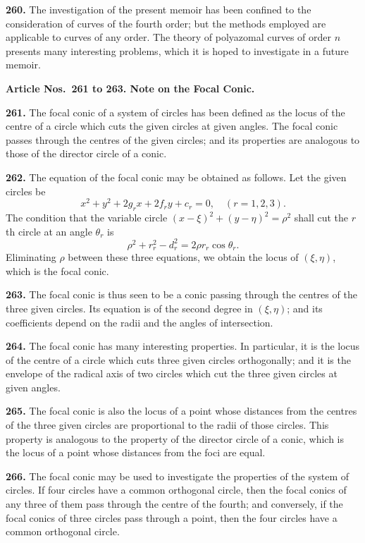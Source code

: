 \documentclass[12pt,a4paper]{article}
\theoremstyle{definition}
\begin{document}
\noindent\textbf{260.} The investigation of the present memoir has been confined to the consideration
of curves of the fourth order; but the methods employed are applicable to
curves of any order. The theory of polyazomal curves of order $n$ presents many
interesting problems, which it is hoped to investigate in a future memoir.

\vspace{0.5em}
\noindent\textbf{Article Nos.~261 to 263. Note on the Focal Conic.}

\vspace{0.3em}
\noindent\textbf{261.} The focal conic of a system of circles has been defined as the locus of the
centre of a circle which cuts the given circles at given angles. The focal conic passes
through the centres of the given circles; and its properties are analogous to those of
the director circle of a conic.

\noindent\textbf{262.} The equation of the focal conic may be obtained as follows. Let the
given circles be
\[
x^2 + y^2 + 2g_rx + 2f_ry + c_r = 0, \quad (r = 1, 2, 3).
\]
The condition that the variable circle $(x - \xi)^2 + (y - \eta)^2 = \rho^2$ shall cut the $r$th circle
at an angle $\theta_r$ is
\[
\rho^2 + r_r^2 - d_r^2 = 2\rho r_r\cos\theta_r.
\]
Eliminating $\rho$ between these three equations, we obtain the locus of $(\xi, \eta)$, which is the
focal conic.

\noindent\textbf{263.} The focal conic is thus seen to be a conic passing through the centres
of the three given circles. Its equation is of the second degree in $(\xi, \eta)$; and its
coefficients depend on the radii and the angles of intersection.

\newpage
\noindent\textbf{264.} The focal conic has many interesting properties. In particular, it is
the locus of the centre of a circle which cuts three given circles orthogonally; and it is
the envelope of the radical axis of two circles which cut the three given circles at given
angles.

\noindent\textbf{265.} The focal conic is also the locus of a point whose distances from the
centres of the three given circles are proportional to the radii of those circles. This
property is analogous to the property of the director circle of a conic, which is the locus
of a point whose distances from the foci are equal.

\noindent\textbf{266.} The focal conic may be used to investigate the properties of the system
of circles. If four circles have a common orthogonal circle, then the focal conics of
any three of them pass through the centre of the fourth; and conversely, if the focal
conics of three circles pass through a point, then the four circles have a common
orthogonal circle.
\end{document}
